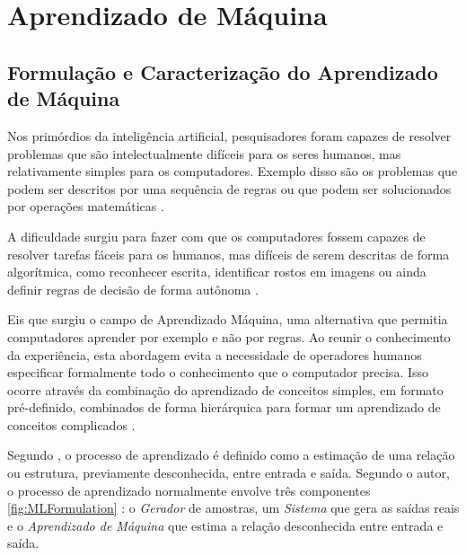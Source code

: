 
\chapter{Aprendizado de Máquina}
\label{chap:MachineLearning}

\section{Formulação e Caracterização do Aprendizado de Máquina}

Nos primórdios da inteligência artificial, pesquisadores foram capazes de resolver problemas que são intelectualmente difíceis para os seres humanos, mas relativamente simples para os computadores. Exemplo disso são os problemas que podem ser descritos por uma sequência de regras ou que podem ser solucionados por operações matemáticas \cite{Goodfellow-et-al-2016}.

A dificuldade surgiu para fazer com que os computadores fossem capazes de resolver tarefas fáceis para os humanos, mas difíceis de serem descritas de forma algorítmica, como reconhecer escrita, identificar rostos em imagens ou ainda definir regras de decisão de forma autônoma \cite{Goodfellow-et-al-2016}.

Eis que surgiu o campo de Aprendizado Máquina, uma alternativa que permitia computadores aprender por exemplo e não por regras. Ao reunir o conhecimento da experiência, esta abordagem evita a necessidade de operadores humanos especificar formalmente todo o conhecimento que o computador precisa. Isso ocorre através da combinação do aprendizado de conceitos simples, em formato pré-definido, combinados de forma hierárquica para formar um aprendizado de conceitos complicados \cite{Goodfellow-et-al-2016}.

Segundo , o processo de aprendizado é definido como a estimação de uma relação ou estrutura, previamente desconhecida, entre entrada e saída. Segundo o autor, o processo de aprendizado normalmente envolve três componentes \ref{fig:MLFormulation} : o \textit{Gerador} de amostras, um \textit{Sistema} que gera as saídas reais e o \textit{Aprendizado de Máquina} que estima a relação desconhecida entre entrada e saída. 

